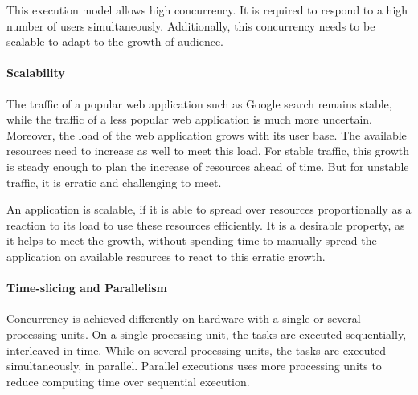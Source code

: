 This execution model allows high concurrency.
It is required to respond to a high number of users simultaneously.
Additionally, this concurrency needs to be scalable to adapt to the growth of audience. %

\paragraph{Scalability}


The traffic of a popular web application such as Google search remains stable, while the traffic of a less popular web application is much more uncertain.
Moreover, the load of the web application grows with its user base.
The available resources need to increase as well to meet this load.
For stable traffic, this growth is steady enough to plan the increase of resources ahead of time.
But for unstable traffic, it is erratic and challenging to meet.

An application is scalable, if it is able to spread over resources proportionally as a reaction to its load to use these resources efficiently.
It is a desirable property, as it helps to meet the growth, without spending time to manually spread the application on available resources to react to this erratic growth.

\paragraph{Time-slicing and Parallelism}

Concurrency is achieved differently on hardware with a single or several processing units.
On a single processing unit, the tasks are executed sequentially, interleaved in time.
While on several processing units, the tasks are executed simultaneously, in parallel.
Parallel executions uses more processing units to reduce computing time over sequential execution.

